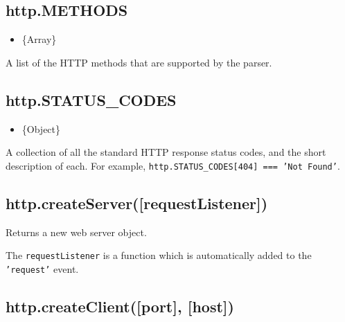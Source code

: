 \begin{Shaded}
\begin{Highlighting}[]
\NormalTok{[ }\NormalTok{, }\NormalTok{,}
  \NormalTok{, }\NormalTok{,}
  \NormalTok{, }\NormalTok{,}
  \NormalTok{, }\NormalTok{,}
  \NormalTok{, }\NormalTok{,}
  \NormalTok{, } \NormalTok{]}
\end{Highlighting}
\end{Shaded}

\subsection{http.METHODS}\label{http.methods}

\begin{itemize}
\itemsep1pt\parskip0pt
\item
  \{Array\}
\end{itemize}

A list of the HTTP methods that are supported by the parser.

\subsection{http.STATUS\_CODES}\label{http.statusux5fcodes}

\begin{itemize}
\itemsep1pt\parskip0pt
\item
  \{Object\}
\end{itemize}

A collection of all the standard HTTP response status codes, and the
short description of each. For example,
\texttt{http.STATUS\_CODES{[}404{]} === 'Not Found'}.

\subsection{http.createServer({[}requestListener{]})}\label{http.createserverrequestlistener}

Returns a new web server object.

The \texttt{requestListener} is a function which is automatically added
to the \texttt{'request'} event.

\subsection{http.createClient({[}port{]},
{[}host{]})}\label{http.createclientport-host}

